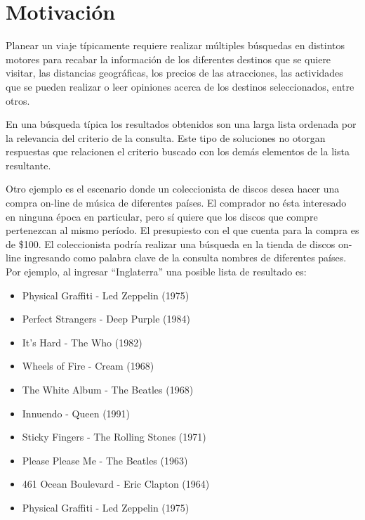 \section{Motivación}
Planear un viaje típicamente requiere realizar múltiples búsquedas en distintos motores para recabar la información de los diferentes destinos que se quiere visitar, las distancias geográficas, los precios de las atracciones, las actividades que se pueden realizar o leer opiniones acerca de los destinos seleccionados, entre otros.

En una búsqueda típica los resultados obtenidos son una larga lista ordenada por la relevancia del criterio de la consulta. Este tipo de soluciones no otorgan respuestas que relacionen el criterio buscado con los demás elementos de la lista resultante.

Otro ejemplo es el escenario donde un coleccionista de discos desea hacer una compra on-line de música de diferentes países. El comprador no ésta interesado en ninguna época en particular, pero sí quiere que los discos que compre pertenezcan al mismo período. El presupiesto con el que cuenta para la compra es de \$100. El coleccionista podría realizar una búsqueda en la tienda de discos on-line ingresando como palabra clave de la consulta nombres de diferentes países. Por ejemplo, al ingresar ``Inglaterra'' una posible lista de resultado es:
\begin{itemize}
  \item Physical Graffiti - Led Zeppelin (1975)
  \item Perfect Strangers - Deep Purple (1984)
  \item It's Hard - The Who  (1982)
  \item Wheels of Fire - Cream (1968)
  \item The White Album - The Beatles (1968)
  \item Innuendo - Queen (1991)
  \item Sticky Fingers - The Rolling Stones (1971)
	\item Please Please Me - The Beatles (1963)
	\item 461 Ocean Boulevard - Eric Clapton (1964)
	\item Physical Graffiti - Led Zeppelin (1975)
\end{itemize}

